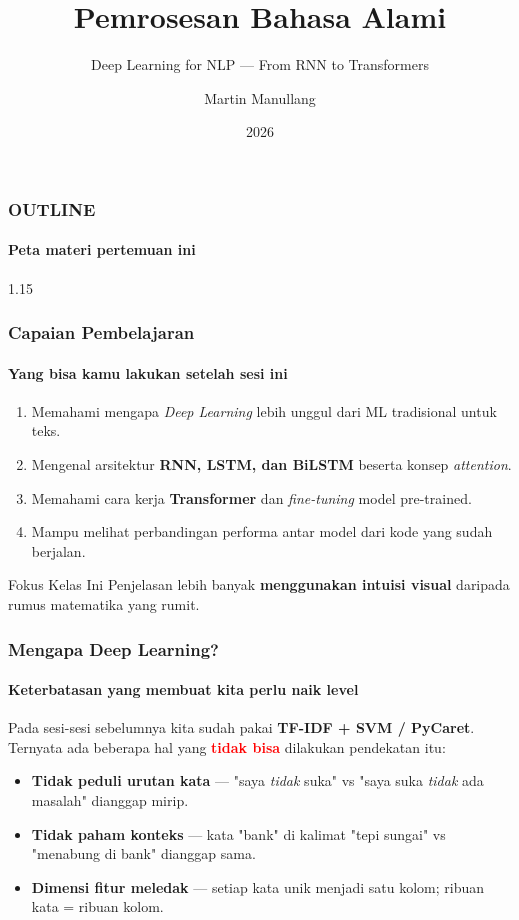 \documentclass[t,aspectratio=169,xcolor=dvipsnames]{beamer}
\title[Workshop Sesi DL]{Pemrosesan Bahasa Alami}
\subtitle{Deep Learning for NLP — From RNN to Transformers}
\author[SD25-32202]{Martin Manullang}
\institute[ITERA]{Institut Teknologi Sumatera \\ mctm.web.id}
\date{\textcolor{nyublue}{2026}}
\newcommand{\tem}[1]{\textbf{\textcolor{red}{#1}}}
\begin{document}
\begin{frame}
    \titlepage
\end{frame}

\begin{frame}
    \frametitle{OUTLINE}
    \framesubtitle{Peta materi pertemuan ini}
    \small
    \begin{spacing}{1.15}
        \tableofcontents
    \end{spacing}
\end{frame}


\begin{frame}
    \frametitle{Capaian Pembelajaran}
    \framesubtitle{Yang bisa kamu lakukan setelah sesi ini}
    \small
    \begin{enumerate}
        \item Memahami mengapa \textit{Deep Learning} lebih unggul dari ML tradisional untuk teks.
        \item Mengenal arsitektur \textbf{RNN, LSTM, dan BiLSTM} beserta konsep \textit{attention}.
        \item Memahami cara kerja \textbf{Transformer} dan \textit{fine-tuning} model pre-trained.
        \item Mampu melihat perbandingan performa antar model dari kode yang sudah berjalan.
    \end{enumerate}
    \begin{exampleblock}{Fokus Kelas Ini}
        Penjelasan lebih banyak \textbf{menggunakan intuisi visual} daripada rumus matematika yang rumit.
    \end{exampleblock}
\end{frame}

\begin{frame}
    \frametitle{Mengapa Deep Learning?}
    \framesubtitle{Keterbatasan yang membuat kita perlu naik level}
    \small
    Pada sesi-sesi sebelumnya kita sudah pakai \textbf{TF-IDF + SVM / PyCaret}.\\[0.4em]
    Ternyata ada beberapa hal yang \tem{tidak bisa} dilakukan pendekatan itu:
    \vspace{0.3em}
    \begin{itemize}
        \item \textbf{Tidak peduli urutan kata} — "saya \textit{tidak} suka" vs "saya suka \textit{tidak} ada masalah" dianggap mirip.
        \item \textbf{Tidak paham konteks} — kata "bank" di kalimat "tepi sungai" vs "menabung di bank" dianggap sama.
        \item \textbf{Dimensi fitur meledak} — setiap kata unik menjadi satu kolom; ribuan kata = ribuan kolom.
    \end{itemize}
\end{frame}
\end{document}
